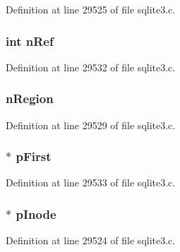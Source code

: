 Definition at line 29525 of file sqlite3.\+c.

\hypertarget{structunix_shm_node_a3c459f9ae278c22b72583c55ca01acb7}{}
\subsubsection[{n\+Ref}]{\setlength{\rightskip}{0pt plus 5cm}int n\+Ref}\label{structunix_shm_node_a3c459f9ae278c22b72583c55ca01acb7}


Definition at line 29532 of file sqlite3.\+c.

\hypertarget{structunix_shm_node_af979ee5229cb18d9aba863e14d0bd0c7}{}
\subsubsection[{n\+Region}]{ n\+Region}\label{structunix_shm_node_af979ee5229cb18d9aba863e14d0bd0c7}


Definition at line 29529 of file sqlite3.\+c.

\hypertarget{structunix_shm_node_a683e683f67cac8938671ef8edd2dc730}{}
\subsubsection[{p\+First}]{$\ast$ p\+First}\label{structunix_shm_node_a683e683f67cac8938671ef8edd2dc730}


Definition at line 29533 of file sqlite3.\+c.

\hypertarget{structunix_shm_node_afe19cb877f2c3a50ca04a8272ed435b8}{}
\subsubsection[{p\+Inode}]{$\ast$ p\+Inode}\label{structunix_shm_node_afe19cb877f2c3a50ca04a8272ed435b8}


Definition at line 29524 of file sqlite3.\+c.

